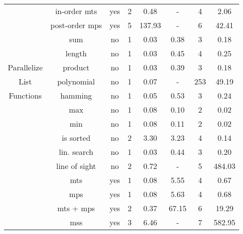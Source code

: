 \begin{table}
{\begin{tabular}[h]{|c|c|c|c|c|c|c|c|}
			 & in-order mts & yes & 2 & 0.48 & - & 4 & 2.06\\ 
			 & post-order mps & yes & 5 & 137.93 & - & 6 & 42.41\\ 
			\hline
			 & sum & no & 1 & 0.03 & 0.38 & 3 & 0.18\\ 
			 & length & no & 1 & 0.03 & 0.45 & 4 & 0.25\\ 
			Parallelize & product & no & 1 & 0.03 & 0.39 & 3 & 0.18\\ 
			List & polynomial & no & 1 & 0.07 & - & 253 & 49.19\\ 
			Functions & hamming & no & 1 & 0.05 & 0.53 & 3 & 0.24\\ 
			 & max & no & 1 & 0.08 & 0.10 & 2 & 0.02\\ 
			 & min & no & 1 & 0.08 & 0.11 & 2 & 0.02\\ 
			 & is sorted & no & 2 & 3.30 & 3.23 & 4 & 0.14\\ 
			 & lin. search & no & 1 & 0.03 & 0.44 & 3 & 0.20\\ 
			 & line of sight & no & 2 & 0.72 & - & 5 & 484.03\\ 
			 & mts & yes & 1 & 0.08 & 5.55 & 4 & 0.67\\ 
			 & mps & yes & 1 & 0.08 & 5.63 & 4 & 0.68\\ 
			 & mts + mps & yes & 2 & 0.37 & 67.15 & 6 & 19.29\\ 
			 & mss & yes & 3 & 6.46 & - & 7 & 582.95\\ 
			\hline
		\end{tabular}
	}
\end{table}
